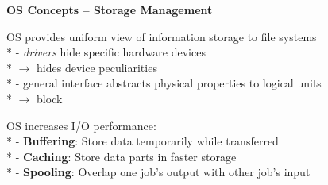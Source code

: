 \textbf{OS Concepts -- Storage Management}
\begin{items}
	\item OS provides uniform view of information storage to file systems \\*
		- \emph{drivers} hide specific hardware devices \\* \phantom{-} \( \to \) hides device peculiarities \\*
		- general interface abstracts physical properties to logical units \\* \phantom{-} \( \to \) block
	\item OS increases I/O performance: \\*
		- \textbf{Buffering}: Store data temporarily while transferred \\*
		- \textbf{Caching}: Store data parts in faster storage \\*
		- \textbf{Spooling}: Overlap one job's output with other job's input
\end{items}
